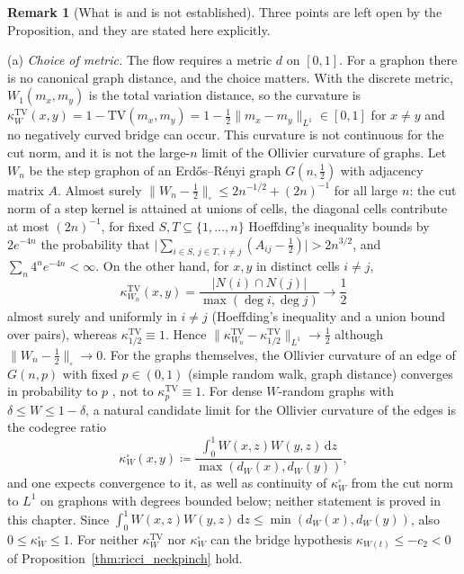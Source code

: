 \documentclass[11pt,a4paper,reqno]{amsart}
\theoremstyle{definition}
\newtheorem{remark}[theorem]{Remark}
\numberwithin{equation}{section}
\providecommand{\cutnorm}[1]{\|#1\|_{\square}}
\newcommand{\dif}{\,\mathrm{d}}
\providecommand{\cutnorm}[1]{\|#1\|_{\square}}
\begin{document}
\begin{remark}[What is and is not established]
Three points are left open by the Proposition, and they are stated here explicitly.

(a) \emph{Choice of metric.} The flow requires a metric $d$ on $[0,1]$. For a graphon there is no canonical graph distance, and the choice matters. With the discrete metric, $W_1(m_x,m_y)$ is the total variation distance, so the curvature is $\kappa^{\mathrm{TV}}_W(x,y) = 1-\mathrm{TV}(m_x,m_y) = 1 - \tfrac12\|m_x-m_y\|_{L^1} \in [0,1]$ for $x \ne y$ and no negatively curved bridge can occur. This curvature is not continuous for the cut norm, and it is not the large-$n$ limit of the Ollivier curvature of graphs. Let $W_n$ be the step graphon of an Erd\H{o}s--R\'enyi graph $G(n,\tfrac12)$ with adjacency matrix $A$. Almost surely $\cutnorm{W_n-\tfrac12} \le 2n^{-1/2}+(2n)^{-1}$ for all large $n$: the cut norm of a step kernel is attained at unions of cells, the diagonal cells contribute at most $(2n)^{-1}$, for fixed $S,T\subseteq\{1,\dots,n\}$ Hoeffding's inequality bounds by $2e^{-4n}$ the probability that $\big|\sum_{i\in S,\,j\in T,\,i\ne j}(A_{ij}-\tfrac12)\big| > 2n^{3/2}$, and $\sum_n 4^n e^{-4n}<\infty$. On the other hand, for $x,y$ in distinct cells $i\ne j$,
\begin{equation*}
    \kappa^{\mathrm{TV}}_{W_n}(x,y) = \frac{|N(i)\cap N(j)|}{\max(\deg i,\deg j)} \longrightarrow \frac12
\end{equation*}
almost surely and uniformly in $i\ne j$ (Hoeffding's inequality and a union bound over pairs), whereas $\kappa^{\mathrm{TV}}_{1/2}\equiv 1$. Hence $\|\kappa^{\mathrm{TV}}_{W_n}-\kappa^{\mathrm{TV}}_{1/2}\|_{L^1}\to\tfrac12$ although $\cutnorm{W_n-\tfrac12}\to0$. For the graphs themselves, the Ollivier curvature of an edge of $G(n,p)$ with fixed $p\in(0,1)$ (simple random walk, graph distance) converges in probability to $p$ \cite[Thm.~6.3(f)]{bhattacharya2015exact}, not to $\kappa^{\mathrm{TV}}_p\equiv1$. For dense $W$-random graphs with $\delta\le W\le1-\delta$, a natural candidate limit for the Ollivier curvature of the edges is the codegree ratio
\begin{equation*}
    \kappa^{\square}_W(x,y) \coloneqq \frac{\int_0^1 W(x,z)W(y,z)\dif z}{\max(d_W(x),d_W(y))},
\end{equation*}
and one expects convergence to it, as well as continuity of $\kappa^{\square}_W$ from the cut norm to $L^1$ on graphons with degrees bounded below; neither statement is proved in this chapter. Since $\int_0^1 W(x,z)W(y,z)\dif z \le \min(d_W(x),d_W(y))$, also $0\le\kappa^{\square}_W\le1$. For neither $\kappa^{\mathrm{TV}}_W$ nor $\kappa^{\square}_W$ can the bridge hypothesis $\kappa_{W(t)}\le-c_2<0$ of Proposition~\ref{thm:ricci_neckpinch} hold.


\end{remark}
\end{document}
